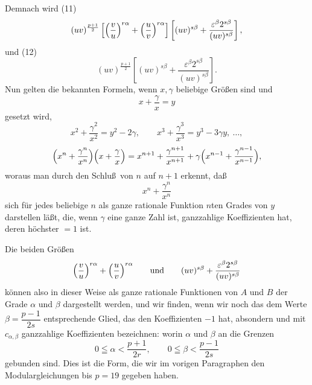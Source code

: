 Demnach wird (11)
\[
(uv)^{\frac{p+1}{2}}\left[\Bigl(\frac{v}{u}\Bigr)^{r\alpha}+\Bigl(\frac{u}{v}\Bigr)^{r\alpha}\right]\left[(uv)^{s\beta}+\frac{\varepsilon^\beta2^{s\beta}}{(uv)^{s\beta}}\right],
\]
und (12)
\[
(uv)^{\frac{p+1}{2}}\left[(uv)^{s\beta}+\frac{\varepsilon^\beta2^{s\beta}}{(uv)^{s\beta}}\right].
\]
Nun gelten die bekannten Formeln, wenn $x, \gamma$ beliebige
Gr\"o\ss en sind und
\[
x+\frac{\gamma}{x}=y
\]
gesetzt wird,
\[
x^2+\frac{\gamma^2}{x^2}=y^2-2\gamma, \qquad x^3+\frac{\gamma^3}{x^3}=y^3-3\gamma y,\ \ldots,
\]
\[
\Bigl(x^n+\frac{\gamma^n}{x^n}\Bigr)\Bigl(x+\frac{\gamma}{x}\Bigr)=x^{n+1}+\frac{\gamma^{n+1}}{x^{n+1}}+\gamma\Bigl(x^{n-1}+\frac{\gamma^{n-1}}{x^{n-1}}\Bigr),
\]
woraus man durch den Schlu\ss\ von $n$ auf $n+1$ erkennt, da\ss
\[
x^n+\frac{\gamma^n}{x^n}
\]
sich f\"ur jedes beliebige $n$ als ganze rationale Funktion $n$ten
Grades von $y$ darstellen l\"a\ss t, die, wenn $\gamma$ eine ganze
Zahl ist, ganzzahlige Koeffizienten hat, deren h\"ochster $=1$ ist.

Die beiden Gr\"o\ss en
\[
\Bigl(\frac{v}{u}\Bigr)^{r\alpha}+\Bigl(\frac{u}{v}\Bigr)^{r\alpha} \qquad \text{und} \qquad (uv)^{s\beta}+\frac{\varepsilon^\beta2^{s\beta}}{(uv)^{s\beta}}
\]
k\"onnen also in dieser Weise als ganze rationale Funktionen von
$A$ und $B$ der Grade $\alpha$ und $\beta$ dargestellt werden, und
wir finden, wenn wir noch das dem Werte $\beta=\dfrac{p-1}{2s}$
entsprechende Glied, das den Koeffizienten $-1$ hat, absondern und
mit $c_{\alpha,\beta}$ ganzzahlige Koeffizienten bezeichnen:
worin $\alpha$ und $\beta$ an die Grenzen
\[
0\leqq\alpha<\frac{p+1}{2r}, \qquad 0\leqq\beta<\frac{p-1}{2s}
\]
gebunden sind. Dies ist die Form, die wir im vorigen Paragraphen
den Modulargleichungen bis $p=19$ gegeben haben.
